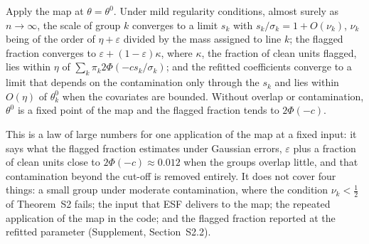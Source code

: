 \begin{proposition}
\label{thm:step}
Apply the map at $\theta=\theta^{0}$. Under mild regularity conditions, almost surely as
$n\to\infty$, the scale of group $k$ converges to a limit $s_k$ with $s_k/\sigma_k=1+O(\nu_k)$,
$\nu_k$ being of the order of $\eta+\varepsilon$ divided by the mass assigned to line $k$; the
flagged fraction converges to $\varepsilon+(1-\varepsilon)\kappa$, where $\kappa$, the fraction
of clean units flagged, lies within $\eta$ of $\sum_k\pi_k2\Phi(-cs_k/\sigma_k)$; and the
refitted coefficients converge to a limit that depends on the contamination only through the
$s_k$ and lies within $O(\eta)$ of $\theta^{0}_k$ when the covariates are bounded. Without
overlap or contamination, $\theta^{0}$ is a fixed point of the map and the flagged fraction
tends to $2\Phi(-c)$.
\end{proposition}

This is a law of large numbers for one application of the map at a fixed input: it says what
the flagged fraction estimates under Gaussian errors, $\varepsilon$ plus a fraction of clean
units close to $2\Phi(-c)\approx0.012$ when the groups overlap little, and that contamination
beyond the cut-off is removed entirely. It does not cover four things: a small group under
moderate contamination, where the condition $\nu_k<\tfrac12$ of Theorem~S2 fails; the input
that ESF delivers to the map; the repeated application of the map in the code; and the flagged
fraction reported at the refitted parameter (Supplement, Section~S2.2).



